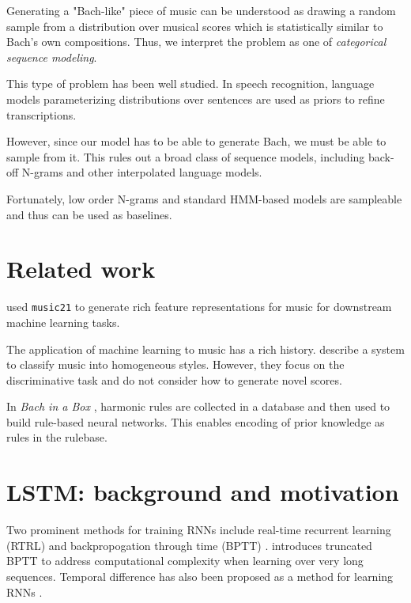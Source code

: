 Generating a "Bach-like" piece of music can be understood as drawing a random
sample from a distribution over musical scores which is statistically similar
to Bach's own compositions. Thus, we interpret the problem as one of
\emph{categorical sequence modeling}.

This type of problem has been well studied. In speech recognition, language
models parameterizing distributions over sentences are used as priors to refine
transcriptions.

However, since our model has to be able to generate Bach, we must be able to
sample from it. This rules out a broad class of sequence models, including
back-off N-grams and other interpolated language models.

Fortunately, low order N-grams and standard HMM-based models are sampleable and
thus can be used as baselines.

\section{Related work}

\cite{Cuthbert2011} used
\texttt{music21} to generate rich feature representations for music for
downstream machine learning tasks.

The application of machine learning to music has a rich history.
\cite{Herlands2014} describe a system to classify music into homogeneous
styles. However, they focus on the discriminative task and do not consider
how to generate novel scores.

In \emph{Bach in a Box} \cite{spangler1998bach},
harmonic rules are collected in a database and then used to build rule-based
neural networks. This enables encoding of prior knowledge as rules in the
rulebase.



\section{LSTM: background and motivation}

Two prominent methods for training RNNs include real-time recurrent learning (RTRL)
\cite{robinson1987utility} and backpropogation through time (BPTT) \cite{williams1995gradient}.
\cite{williams1990efficient} introduces truncated BPTT to address computational complexity
when learning over very long sequences. Temporal difference \cite{sutton1998reinforcement} has
also been proposed as a method for learning RNNs \cite{franklin2004predicting}.

